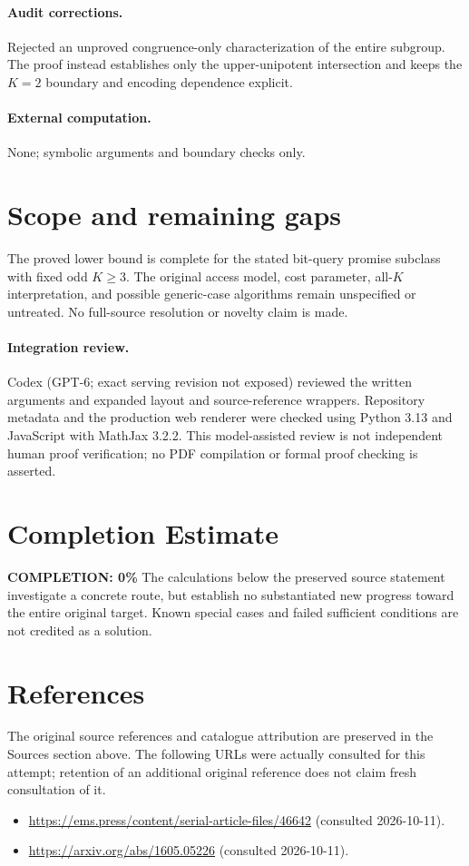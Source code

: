 \documentclass[11pt]{article}
\begin{document}
\paragraph{Audit corrections.} Rejected an unproved congruence-only characterization of the entire subgroup. The proof instead establishes only the upper-unipotent intersection and keeps the $K=2$ boundary and encoding dependence explicit.
\paragraph{External computation.} None; symbolic arguments and boundary checks only.
\section{Scope and remaining gaps}
The proved lower bound is complete for the stated bit-query promise subclass with fixed odd $K\ge3$. The original access model, cost parameter, all-$K$ interpretation, and possible generic-case algorithms remain unspecified or untreated. No full-source resolution or novelty claim is made.
\paragraph{Integration review.} Codex (GPT-6; exact serving revision not exposed) reviewed the written arguments and expanded layout and source-reference wrappers. Repository metadata and the production web renderer were checked using Python 3.13 and JavaScript with MathJax 3.2.2. This model-assisted review is not independent human proof verification; no PDF compilation or formal proof checking is asserted.

\section{Completion Estimate}
\noindent\textbf{COMPLETION: 0\%}
The calculations below the preserved source statement investigate a concrete route,
but establish no substantiated new progress toward the entire original target.
Known special cases and failed sufficient conditions are not credited as a solution.
\section{References}
The original source references and catalogue attribution are preserved in the
Sources section above. The following URLs were actually consulted for this attempt;
retention of an additional original reference does not claim fresh consultation of it.
\begin{itemize}
\item \url{https://ems.press/content/serial-article-files/46642} (consulted 2026-10-11). 
\item \url{https://arxiv.org/abs/1605.05226} (consulted 2026-10-11). 
\end{itemize}
\end{document}
